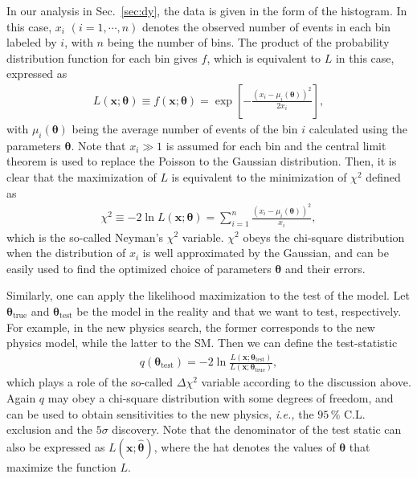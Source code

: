 \documentclass[12pt,twoside,book]{article}
\begin{document}
In our analysis in Sec.~\ref{sec:dy}, the data is given in the form of the histogram.
In this case, $x_i$ $(i=1, \cdots, n)$ denotes the observed number of events in each bin labeled by $i$, with $n$ being the number of bins.
The product of the probability distribution function for each bin gives $f$, which is equivalent to $L$ in this case, expressed as
\begin{align}
  L(\bm{x} ; \bm{\theta}) \equiv f(\bm{x} ; \bm{\theta}) = \exp \left[
    - \frac{\left(x_i - \mu_i (\bm{\theta}) \right)^2}{2 x_i}
  \right],
\end{align}
with $\mu_i (\bm{\theta})$ being the average number of events of the bin $i$ calculated using the parameters $\bm{\theta}$.
Note that $x_i \gg 1$ is assumed for each bin and the central limit theorem is used to replace the Poisson to the Gaussian distribution.
Then, it is clear that the maximization of $L$ is equivalent to the minimization of $\chi^2$ defined as
\begin{align}
  \chi^2 \equiv -2 \ln L(\bm{x} ; \bm{\theta}) = \sum_{i=1}^{n}
  \frac{\left(x_i - \mu_i (\bm{\theta}) \right)^2}{x_i},
\end{align}
which is the so-called Neyman's $\chi^2$ variable.
$\chi^2$ obeys the chi-square distribution when the distribution of $x_i$ is well approximated by the Gaussian, and can be easily used to find the optimized choice of parameters $\bm{\theta}$ and their errors.

Similarly, one can apply the likelihood maximization to the test of the model.
Let $\bm{\theta}_{\mathrm{true}}$ and $\bm{\theta}_{\mathrm{test}}$ be the model in the reality and that we want to test, respectively.
For example, in the new physics search, the former corresponds to the new physics model, while the latter to the SM.
Then we can define the test-statistic
\begin{align}
  q (\bm{\theta}_{\mathrm{test}}) =
  -2 \ln \frac{L(\bm{x} ; \bm{\theta}_{\mathrm{test}})}
  {L(\bm{x} ; \bm{\theta}_{\mathrm{true}})},
\end{align}
which plays a role of the so-called $\Delta \chi^2$ variable according to the discussion above.
Again $q$ may obey a chi-square distribution with some degrees of freedom, and can be used to obtain sensitivities to the new physics, \textit{i.e.,} the $95\,\%$ C.L. exclusion and the $5\sigma$ discovery.
Note that the denominator of the test static can also be expressed as $L(\bm{x} ; \hat{\bm{\theta}})$, where the hat denotes the values of $\bm{\theta}$ that maximize the function $L$.
\end{document}
